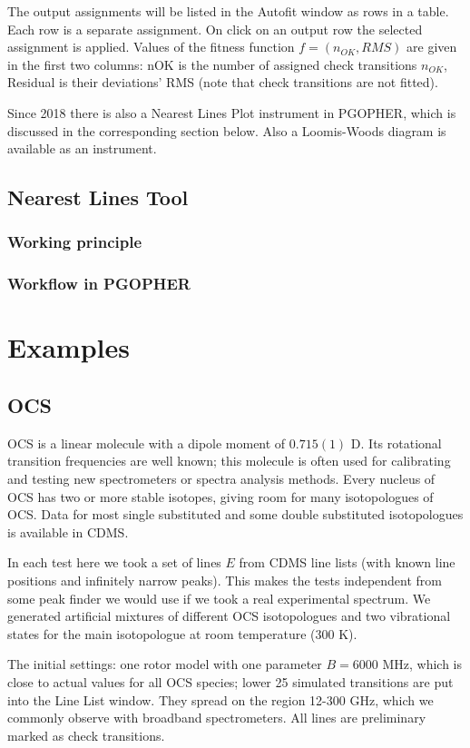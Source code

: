 \documentclass[11pt]{article}
\begin{document}
The output assignments will be listed in the Autofit window as rows in a table. Each row is a separate assignment. On click on an output row the selected assignment is applied. Values of the fitness function $f = (n_{OK}, {RMS})$ are given in the first two columns: nOK is the number of assigned check transitions $n_{OK}$, Residual is their deviations' RMS (note that check transitions are not fitted).

Since 2018 there is also a Nearest Lines Plot instrument in PGOPHER, which is discussed in the corresponding section below. Also a Loomis-Woods diagram is available as an instrument.

\subsection{Nearest Lines Tool}
\subsubsection{Working principle}
\subsubsection{Workflow in PGOPHER}


\section{Examples}
\subsection{OCS}

OCS is a linear molecule with a dipole moment of $0.715(1)$ D. Its rotational transition frequencies are well known; this molecule is often used for calibrating and testing new spectrometers or spectra analysis methods. Every nucleus of OCS has two or more stable isotopes, giving room for many isotopologues of OCS. Data for most single substituted and some double substituted isotopologues is available in CDMS.

In each test here we took a set of lines $E$ from CDMS line lists (with known line positions and infinitely narrow peaks). This makes the tests independent from some peak finder we would use if we took a real experimental spectrum. We generated artificial mixtures of different OCS isotopologues and two vibrational states for the main isotopologue at room temperature (300 K).

The initial settings: one rotor model with one parameter $B = 6000$ MHz, which is close to actual values for all OCS species; lower 25 simulated transitions are put into the Line List window. They spread on the region 12-300 GHz, which we commonly observe with broadband spectrometers. All lines are preliminary marked as check transitions. 
\end{document}
